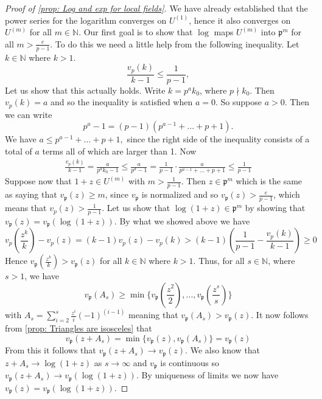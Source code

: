 \documentclass{article}
\newcommand{\mfrak}[1]{\mathfrak{#1}}
\newcommand{\mbb}[1]{\mathbb{#1}}
\newcommand{\vp}{{v_{\mfrak p}}}
\numberwithin{equation}{section}
\begin{document}
\begin{proof}[Proof of \cref{prop: Log and exp for local fields}]
	We have already established that the power series for the logarithm converges on $U^{(1)}$, hence it also converges on $U^{(m)}$ for all $m \in \mbb N$. Our first goal is to show that $\log$ maps $U^{(m)}$ into $\mfrak p^{m}$ for all $m > \frac{e}{p-1}$.  To do this we need a little help from the following inequality. Let $k \in \mbb N$ where $k > 1$.
	$$\frac{v_p(k)}{k-1} \leq \frac{1}{p-1},$$
	Let us show that this actually holds. Write $k = p^ak_0$, where $p \nmid k_0$. Then $v_p(k) = a$ and so the inequality is satisfied when $a = 0$. So suppose $a > 0$. Then we can write
	$$p^a - 1 = (p-1)(p^{a-1} + ... + p + 1).$$
	We have
	$a \leq p^{a-1} + ... + p + 1,$
	since the right side of the inequality consists of a total of $a$ terms all of which are larger than 1. Now
	\begin{align*}
    	\frac{v_p(k)}{k-1} = \frac{a}{p^ak_0-1} \leq \frac{a}{p^a - 1} = \frac{1}{p-1}\cdot \frac{a}{p^{a-1} + ... + p + 1} \leq \frac{1}{p-1}
	\end{align*}
	Suppose now that $1+z \in U^{(m)}$ with $m > \frac{1}{p-1}$. Then $z \in \mfrak p^m$ which is the same as saying that $\vp (z) \geq m$, since $\vp$ is normalized and so $\vp(z) > \frac{e}{p-1}$, which means that $v_p(z) > \frac{1}{p-1}$. Let us show that $\log(1+z) \in \mfrak p^m$ by showing that $\vp(z) = \vp(\log(1+ z))$. By what we showed above we have
	$$v_p(\frac{z^k}{k}) - v_p(z) = (k-1)v_p(z) - v_p(k) > (k-1)(\frac{1}{p-1} - \frac{v_p(k)}{k-1}) \geq 0$$
	Hence $\vp(\frac{z^k}{k}) > \vp(z)$ for all $k \in \mbb N$ where $k > 1$. Thus, for all $s \in \mbb N$, where $s > 1$, we have $$\vp(A_s) \geq \min \{\vp(\frac{z^2}{2}), ..., \vp(\frac{z^s}{s}) \}$$
	with $A_s = \sum_{i = 2}^s \frac{z^i}{i} (-1)^{(i-1)}$ meaning that $\vp(A_s) > \vp(z)$. It now follows from \cref{prop: Triangles are isosceles} that
	$$\vp(z + A_s) = \min\{\vp(z), \vp(A_s)\} = \vp(z)$$
	From this it follows that $\vp(z + A_s) \to \vp(z)$. We also know that $z + A_s \to \log(1 + z)$ as $s \to \infty$ and $\vp$ is continuous so $\vp(z + A_s) \to \vp(\log(1 + z))$. By uniqueness of limits we now have $\vp(z) = \vp(\log(1+z))$.


\end{proof}
\end{document}
